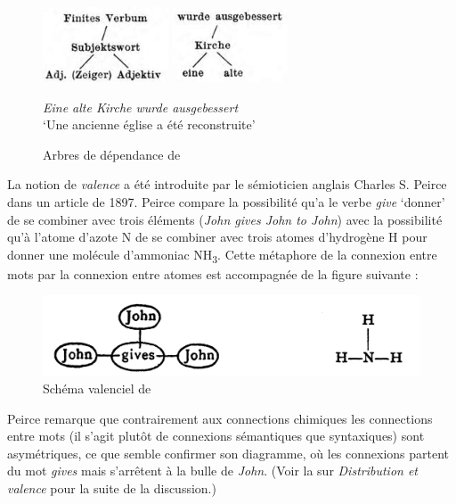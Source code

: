 {    \begin{figure}
      \caption{Arbres de dépendance de \citet{kern1883zur}}
    \includegraphics[width=.45\textwidth]{figures/vol1syntaxe2-img014.png}
    \includegraphics[width=.45\textwidth]{figures/vol1syntaxe2-img015.png}\medskip\\
    \raggedright 
    \textit{Eine alte Kirche wurde ausgebessert}\\
    ‘Une ancienne église a été reconstruite’
    \end{figure}

    La notion de \textit{valence} a été introduite par le sémioticien anglais Charles S. Peirce dans un article de 1897. Peirce compare la possibilité qu’a le verbe \textit{give} ‘donner’ de se combiner avec trois éléments (\textit{John gives John to John}) avec la possibilité qu’à l’atome d’azote N de se combiner avec trois atomes d’hydrogène H pour donner une molécule d’ammoniac NH\textsubscript{3}. Cette métaphore de la connexion entre mots par la connexion entre atomes est accompagnée de la figure suivante :

    \begin{figure}
    \caption{Schéma valenciel de \citet{Peirce1897}}
    \includegraphics[width=\textwidth]{figures/vol1syntaxe2-img016.png}
    \end{figure}

    Peirce remarque que contrairement aux connections chimiques les connections entre mots (il s’agit plutôt de connexions sémantiques que syntaxiques) sont asymétriques, ce que semble confirmer son diagramme, où les connexions partent du mot \textit{gives} mais s’arrêtent à la bulle de \textit{John}. (Voir la  sur \textit{Distribution et valence} pour la suite de la discussion.)

}
